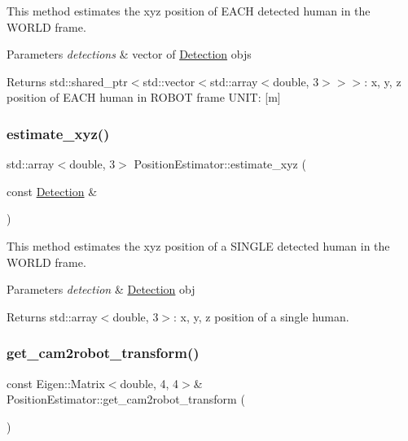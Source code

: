 This method estimates the xyz position of E\+A\+CH detected human in the W\+O\+R\+LD frame. 


\begin{DoxyParams}{Parameters}
{\em detections} & vector of \hyperlink{struct_detection}{Detection} objs \\
\hline
\end{DoxyParams}
\begin{DoxyReturn}{Returns}
std\+::shared\+\_\+ptr$<$std\+::vector$<$std\+::array$<$double, 3$>$$>$$>$\+: x, y, z position of E\+A\+CH human in R\+O\+B\+OT frame U\+N\+IT\+: \mbox{[}m\mbox{]} 
\end{DoxyReturn}
\mbox{\label{class_position_estimator_ab7aca1c0fa82d6836ae698ebe0826edd}} 
\subsubsection{\texorpdfstring{estimate\+\_\+xyz()}{estimate\_xyz()}}
{\footnotesize\ttfamily std\+::array$<$double, 3$>$ Position\+Estimator\+::estimate\+\_\+xyz (\begin{DoxyParamCaption}\item[{const \hyperlink{struct_detection}{Detection} \&}]{ }\end{DoxyParamCaption})}



This method estimates the xyz position of a S\+I\+N\+G\+LE detected human in the W\+O\+R\+LD frame. 


\begin{DoxyParams}{Parameters}
{\em detection} & \hyperlink{struct_detection}{Detection} obj \\
\hline
\end{DoxyParams}
\begin{DoxyReturn}{Returns}
std\+::array$<$double, 3$>$\+: x, y, z position of a single human. 
\end{DoxyReturn}
\mbox{\label{class_position_estimator_a12ae9fe6ea2f7ca1e2054e018c5dabf5}} 
\subsubsection{\texorpdfstring{get\+\_\+cam2robot\+\_\+transform()}{get\_cam2robot\_transform()}}
{\footnotesize\ttfamily const Eigen\+::\+Matrix$<$double, 4, 4$>$\& Position\+Estimator\+::get\+\_\+cam2robot\+\_\+transform (\begin{DoxyParamCaption}{ }\end{DoxyParamCaption})\hspace{0.3cm}{\ttfamily [inline]}}



